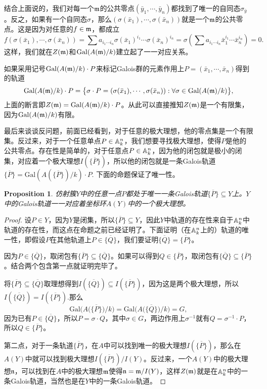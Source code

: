 \documentclass[9pt]{extarticle}
\theoremstyle{plain}%
\newtheorem{pro}[defi]{Proposition}%
\begin{document}
结合上面说的，我们对每一个$\mathfrak{m}$的公共零点$(\bar{y}_1,\cdots,\bar{y}_n)$都找到了唯一的自同态$\sigma_{\bar{y}}$。反之，如果有一个自同态$\sigma$，那么$(\sigma(\bar{x}_1),\cdots,\sigma(\bar{x}_n))$就是一个$\mathfrak{m}$的公共零点。这是因为对任意的$f\in\mathfrak{m}$，都成立
\[
	f(\sigma(\bar{x}_1),\cdots,\sigma(\bar{x}_n))=\sum a_{i_1\cdots i_n} \sigma({\bar{x}}_1)^{i_1}\cdots \sigma({\bar{x}}_n)^{i_n}=\sigma\left(\sum a_{i_1\cdots i_n} \bar{x}_1^{i_1}\cdots \bar{x}_n^{i_n}\right)=0.
\]
这样，我们就在$Z(\mathfrak{m})$和$\mathrm{Gal}(A(\mathfrak{m})/k)$建立起了一一对应关系。

如果采用记号$\mathrm{Gal}(A(\mathfrak{m})/k)\cdot P$来标记Galois群的元素作用上$P=(\bar{x}_1,\cdots,\bar{x}_n)$得到的轨道
\[
	\mathrm{Gal}(A(\mathfrak{m})/k)\cdot P=\bigl\{\sigma\cdot P=(\sigma(\bar{x}_1),\cdots,\sigma(\bar{x}_n)):\forall \sigma\in \mathrm{Gal}(A(\mathfrak{m})/k)\bigr\},
\]
上面的断言即$Z(\mathfrak{m})=\mathrm{Gal}(A(\mathfrak{m})/k)\cdot P$。从此可以直接推知$Z(\mathfrak{m})$是一个有限集，因为$\mathrm{Gal}(A(\mathfrak{m})/k)$有限。

最后来谈谈反问题，前面已经看到，对于任意的极大理想，他的零点集是一个有限集。反过来，对于一个任意单点$P\in \mathbb{A}^n_k$，我们想要寻找极大理想，使得$P$是他的公共零点。存在性是简单的，对于任意点$P\in \mathbb{A}^n_k$，因为他的闭包就是极小的闭集，对应着一个极大理想$I(\overline{\{P\}})$，所以他的闭包就是一条Galois轨道$\overline{\{P\}}=\mathrm{Gal}(A(\overline{\{P\}})/k)\cdot P$. 下面的命题保证了唯一性。
\begin{pro}
仿射簇$Y$中的任意一点$P$都处于唯一一条Galois轨道$\overline{\{P\}}\subseteq Y$上。$Y$中的Galois轨道一一对应着坐标环$A(Y)$中的一个极大理想。
\end{pro}
\begin{proof}
设$P\in Y$，因为$Y$是闭集，所以$\overline{\{P\}}\subseteq Y$，因此$Y$中轨道的存在性来自于$\mathbb{A}^n_k$中轨道的存在性，而这点在命题之前已经证明了。下面证明（在$\mathbb{A}^n_k$上的）轨道的唯一性，即假设$P$在其他轨道上$P\in \overline{\{Q\}}$，我们要证明$\overline{\{Q\}}=\overline{\{P\}}$。

因为$P\in \overline{\{Q\}}$，取闭包有$\overline{\{P\}}\subseteq \overline{\{Q\}}$。如果可以得到$Q\in \overline{\{P\}}$，取闭包有$\overline{\{Q\}}\subseteq \overline{\{P\}}$。结合两个包含第一点就证明完毕了。

将$\overline{\{P\}}\subseteq \overline{\{Q\}}$取理想得到$I(\overline{\{Q\}})\subseteq I(\overline{\{P\}})$，因为这是两个极大理想，所以$I(\overline{\{Q\}})=I(\overline{\{P\}})$.那么
\[
	\mathrm{Gal}\bigl(A\bigl(\overline{\{P\}}\bigr)/k\bigr)=\mathrm{Gal}\bigl(A\bigl(\overline{\{Q\}}\bigr)/k\bigr)=G,
\]
因为已有$P\in \overline{\{Q\}}$，所以$P=\sigma \cdot Q$，其中$\sigma\in G$，两边作用上$\sigma^{-1}$就有$Q=\sigma^{-1}\cdot P$，所以$Q\in \overline{\{P\}}$。

第二点，对于一条轨道$\overline{\{P\}}$，在$A$中可以找到唯一的极大理想$I(\overline{\{P\}})$，那么在$A(Y)$中就可以找到极大理想$I(\overline{\{P\}})/I(Y)$。反过来，一个$A(Y)$中的极大理想$\mathfrak{n}$，可以找到在$A$中的极大理想$\mathfrak{m}$使得$\mathfrak{n}=\mathfrak{m}/I(Y)$，这样$Z(\mathfrak{m})$就是在$\mathbb{A}^n_k$中的一条Galois轨道，当然也是在$Y$中的一条Galois轨道。
\end{proof}
\end{document}
